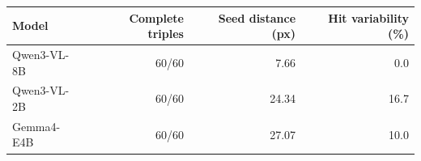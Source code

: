 \begin{tabular}{lrrr}
\toprule
Model & Complete triples & Seed distance (px) & Hit variability (\%) \\
\midrule
Qwen3-VL-8B & 60/60 & 7.66 & 0.0 \\
Qwen3-VL-2B & 60/60 & 24.34 & 16.7 \\
Gemma4-E4B & 60/60 & 27.07 & 10.0 \\
\bottomrule
\end{tabular}
